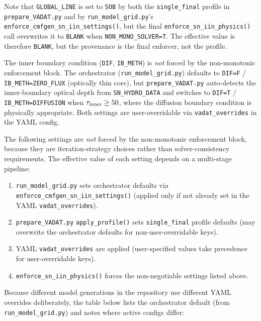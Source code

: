 \documentclass[11pt]{article}
\begin{document}
Note that \texttt{GLOBAL\_LINE} is set to \texttt{SOB} by both the
\texttt{single\_final} profile in \texttt{prepare\_VADAT.py} and by
\texttt{run\_model\_grid.py}'s \texttt{enforce\_cmfgen\_sn\_iin\_settings()},
but the final \texttt{enforce\_sn\_iin\_physics()} call overwrites it to
\texttt{BLANK} when \texttt{NON\_MONO\_SOLVER=T}.  The effective value is
therefore \texttt{BLANK}, but the provenance is the final enforcer, not
the profile.

The inner boundary condition (\texttt{DIF}, \texttt{IB\_METH}) is
\emph{not} forced by the non-monotonic enforcement block.  The
orchestrator (\texttt{run\_model\_grid.py}) defaults to
\texttt{DIF=F} / \texttt{IB\_METH=ZERO\_FLUX} (optically thin core), but
\texttt{prepare\_VADAT.py} auto-detects the inner-boundary optical depth
from \texttt{SN\_HYDRO\_DATA} and switches to \texttt{DIF=T} /
\texttt{IB\_METH=DIFFUSION} when $\tau_{\rm inner} \ge 50$, where the
diffusion boundary condition is physically appropriate.  Both settings
are user-overridable via \texttt{vadat\_overrides} in the YAML config.

The following settings are \emph{not} forced by the non-monotonic
enforcement block, because they are iteration-strategy choices rather
than solver-consistency requirements.  The effective value of each
setting depends on a multi-stage pipeline:
\begin{enumerate}[nosep]
  \item \texttt{run\_model\_grid.py} sets orchestrator defaults via
        \texttt{enforce\_cmfgen\_sn\_iin\_settings()} (applied only if
        not already set in the YAML \texttt{vadat\_overrides}).
  \item \texttt{prepare\_VADAT.py} \texttt{apply\_profile()} sets
        \texttt{single\_final} profile defaults (may overwrite the
        orchestrator defaults for non-user-overridable keys).
  \item YAML \texttt{vadat\_overrides} are applied (user-specified values
        take precedence for user-overridable keys).
  \item \texttt{enforce\_sn\_iin\_physics()} forces the non-negotiable
        settings listed above.
\end{enumerate}
Because different model generations in the repository use different YAML
overrides deliberately, the table below lists the orchestrator default
(from \texttt{run\_model\_grid.py}) and notes where active configs differ:
\end{document}
